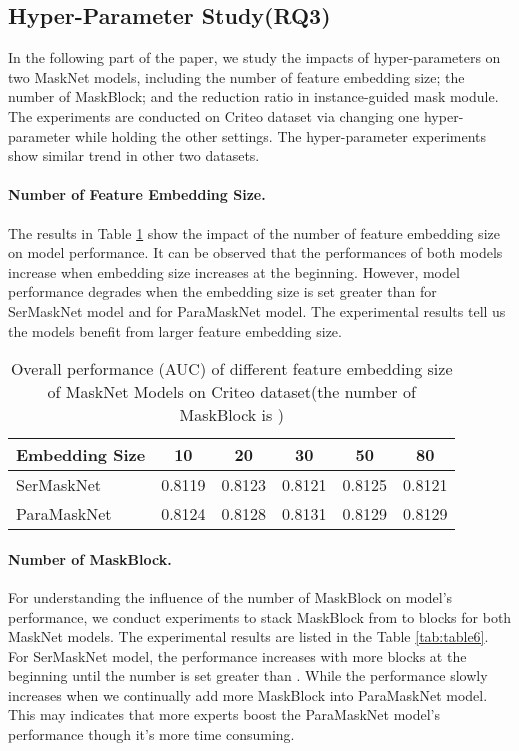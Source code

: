 \documentclass[sigconf]{acmart}
\begin{document}
\subsection{Hyper-Parameter Study(RQ3)}
In the following part of the paper, we study the impacts of hyper-parameters on two MaskNet models, including  the number of feature embedding size;  the number of MaskBlock; and  the reduction ratio in instance-guided mask module. The experiments are conducted on Criteo dataset via changing one hyper-parameter while holding the other settings. The hyper-parameter experiments show similar trend in other two datasets.

\paragraph{\textbf{Number of Feature Embedding Size.}}   The results in Table \ref{tab:table5} show the impact of the number of feature embedding size on model performance. It can be observed that the performances of  both models increase when embedding size increases at the beginning. However, model performance degrades when the embedding size is set greater than  for SerMaskNet model and  for ParaMaskNet model. The experimental results tell us the models benefit from larger feature embedding size.


\begin{table}
  \setlength{\abovecaptionskip}{1pt}
  \caption{Overall performance (AUC) of different feature embedding size of MaskNet Models on Criteo dataset(the number of MaskBlock is )}
  \label{tab:table5}
  \begin{tabular}{lccccc}
  \toprule
  Embedding Size &    10 & 20 & 30 & 50 & 80 \\
  \midrule
  SerMaskNet & 0.8119 & 0.8123 & 0.8121 & 0.8125 & 0.8121 \\
  ParaMaskNet & 0.8124 & 0.8128 & 0.8131 & 0.8129 & 0.8129 \\
  \bottomrule
\end{tabular}
\end{table}

\paragraph{\textbf{Number of MaskBlock.}}   For understanding the influence of the number of MaskBlock on model's performance, we conduct experiments to stack MaskBlock from  to  blocks for both MaskNet models.  The experimental results are listed in the Table \ref{tab:table6}. For SerMaskNet model, the performance increases with more blocks at the beginning until the number is set greater than . While the performance slowly increases when we continually add more MaskBlock into ParaMaskNet model. This may indicates that more experts boost the ParaMaskNet model's performance though it's more time consuming.
\end{document}
